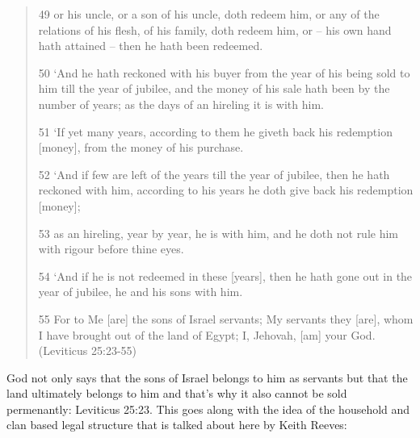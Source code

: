 \documentclass[11pt]{article}
\begin{document}
\begin{quote}
49 or his uncle, or a son of his uncle, doth redeem him, or any of the relations of his flesh, of his family, doth redeem him, or -- his own hand hath attained -- then he hath been redeemed.

50 `And he hath reckoned with his buyer from the year of his being sold to him till the year of jubilee, and the money of his sale hath been by the number of years; as the days of an hireling it is with him.

51 `If yet many years, according to them he giveth back his redemption [money], from the money of his purchase.

52 `And if few are left of the years till the year of jubilee, then he hath reckoned with him, according to his years he doth give back his redemption [money];

53 as an hireling, year by year, he is with him, and he doth not rule him with rigour before thine eyes.

54 `And if he is not redeemed in these [years], then he hath gone out in the year of jubilee, he and his sons with him.

55 For to Me [are] the sons of Israel servants; My servants they [are], whom I have brought out of the land of Egypt; I, Jehovah, [am] your God. (Leviticus 25:23-55)
\end{quote} 

God not only says that the sons of Israel belongs to him as servants but that the land ultimately belongs to him and that's why it also cannot be sold permenantly: Leviticus 25:23. This goes along with the idea of the household and clan based legal structure that is talked about here by Keith Reeves:
\end{document}
